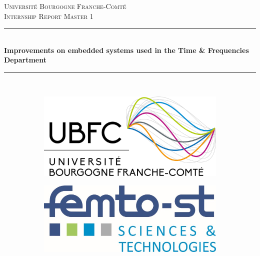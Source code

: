 \documentclass[a4paper,12pt]{article}
\begin{document}
\begin{titlepage}

\newcommand{\HRule}{\rule{\linewidth}{0.5mm}}
\center 

\textsc{\LARGE Université Bourgogne Franche-Comté}\\[1.5cm] 
\textsc{\Large Internship Report Master 1}\\[0.5cm] 

\HRule \\[0.4cm]
{ \huge \bfseries Improvements on embedded systems used in the Time \& Frequencies Department}\\[0.4cm] %
\HRule \\[1.5cm]

\begin{figure}[!h]
\centering
\begin{subfigure}[b]{0.49\textwidth}
	\centering
	\includegraphics[width=\textwidth]{logo_ubfc.png}
	\captionsetup{justification=centering}
\end{subfigure}
\hfill
\begin{subfigure}[b]{0.49\textwidth}
	\centering
	\includegraphics[width=\textwidth]{logo.jpg}
	\captionsetup{justification=centering}
\end{subfigure}
\end{figure}


\end{titlepage}
\end{document}
